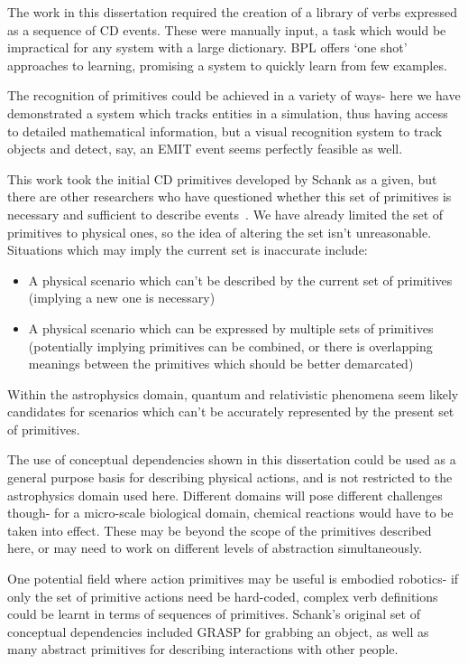 \documentclass[12pt,MSc,wordcount,twoside]{muthesis}
\begin{document}
    The work in this dissertation required the creation of a library of verbs expressed as a sequence of CD events. These were manually input, a task which would be impractical for any system with a large dictionary. BPL offers `one shot' approaches to learning, promising a system to quickly learn from few examples.
    
    The recognition of primitives could be achieved in a variety of ways- here we have demonstrated a system which tracks entities in a simulation, thus having access to detailed mathematical information, but a visual recognition system to track objects and detect, say, an EMIT event seems perfectly feasible as well.

    This work took the initial CD primitives developed by Schank as a given, but there are other researchers who have questioned whether this set of primitives is necessary and sufficient to describe events~\cite{macbethimage}. We have already limited the set of primitives to physical ones, so the idea of altering the set isn't unreasonable. Situations which may imply the current set is inaccurate include:
    \begin{itemize}
        \item A physical scenario which can't be described by the current set of primitives (implying a new one is necessary)
        \item A physical scenario which can be expressed by multiple sets of primitives (potentially implying primitives can be combined, or there is overlapping meanings between the primitives which should be better demarcated)
    \end{itemize}

    Within the astrophysics domain, quantum and relativistic phenomena seem likely candidates for scenarios which can't be accurately represented by the present set of primitives.

    The use of conceptual dependencies shown in this dissertation could be used as a general purpose basis for describing physical actions, and is not restricted to the astrophysics domain used here. Different domains will pose different challenges though- for a micro-scale biological domain, chemical reactions would have to be taken into effect. These may be beyond the scope of the primitives described here, or may need to work on different levels of abstraction simultaneously.

    One potential field where action primitives may be useful is embodied robotics- if only the set of primitive actions need be hard-coded, complex verb definitions could be learnt in terms of sequences of primitives. Schank's original set of conceptual dependencies included GRASP for grabbing an object, as well as many abstract primitives for describing interactions with other people.
\end{document}
